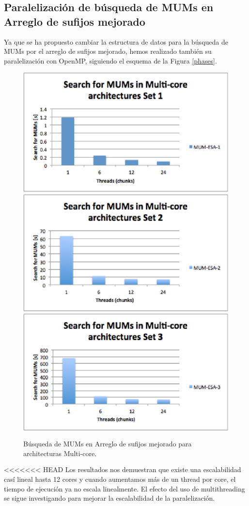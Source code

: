\documentclass[12pt,a4paper]{article}
\begin{document}
\subsection{Paralelización de búsqueda de MUMs en Arreglo de sufijos mejorado}
Ya que se ha propuesto cambiar la estructura de datos para la búsqueda de MUMs por el arreglo de sufijos mejorado, hemos realizado también su paralelización con OpenMP, siguiendo el esquema de la Figura \ref{phases}.
 \begin{figure}[h] 
   \centering 
   \includegraphics[scale=0.5]{esa1.eps} 
   \includegraphics[scale=0.5]{esa2.eps} 
   \includegraphics[scale=0.5]{esa3.eps} 
  \caption{Búsqueda de MUMs en Arreglo de sufijos mejorado para architecturas Multi-core.} 
   \label{fig:stmc} 
 \end{figure}
<<<<<<< HEAD
Los resultados nos demuestran que existe una escalabilidad casí lineal hasta 12 cores y cuando aumentamos más de un thread por core, el tiempo de ejecución ya no escala linealmente. El efecto del uso de multithreading se sigue investigando para mejorar la escalabilidad de la paralelizaci\'on.
\end{document}

